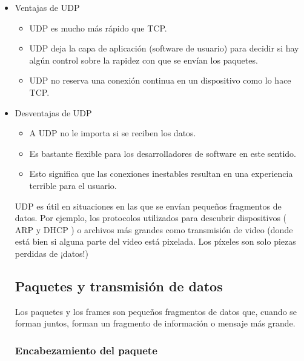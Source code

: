 \begin{itemize}
    \item Ventajas de UDP 
    \begin{itemize}
        \item UDP es mucho más rápido que TCP.
        \item UDP deja la capa de aplicación (software de usuario) para decidir si hay algún control sobre la rapidez con que se envían los paquetes.

    \item UDP no reserva una conexión continua en un dispositivo como lo hace TCP.


    \end{itemize}
    \item Desventajas de UDP
        \begin{itemize}
            \item A UDP no le importa si se reciben los datos.
            \item Es bastante flexible para los desarrolladores de software en este sentido.
            \item Esto significa que las conexiones inestables resultan en una experiencia terrible para el usuario.
        \end{itemize}

UDP es útil en situaciones en las que se envían pequeños fragmentos de datos. Por ejemplo, los protocolos utilizados para descubrir dispositivos ( ARP y DHCP ) o archivos más grandes como transmisión de video (donde está bien si alguna parte del video está pixelada. Los píxeles son solo piezas perdidas de ¡datos!)




\subsection{Paquetes y transmisión de datos}

Los paquetes y los frames son pequeños fragmentos de datos que, cuando se forman juntos, forman un fragmento de información o mensaje más grande.

\subsubsection{Encabezamiento del paquete}


\end{itemize}
